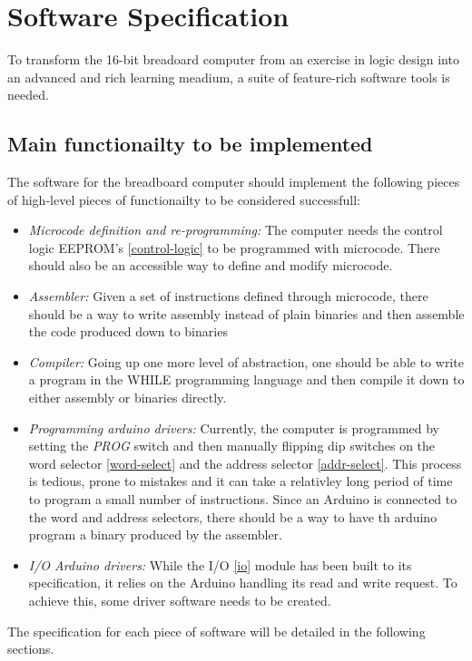 \chapter{Software Specification}
To transform the 16-bit breadoard computer from an exercise in logic design
into an advanced and rich learning meadium, a suite of feature-rich software
tools is needed.

\section{Main functionailty to be implemented}
The software for the breadboard computer should implement the following pieces
of high-level pieces of functionailty to be considered successfull:
\begin{itemize}
  \item \emph{Microcode definition and re-programming: } The computer needs the
  control logic EEPROM's \ref{control-logic} to be programmed with microcode. There
  should also be an accessible way to define and modify microcode.
  \item \emph{Assembler: } Given a set of instructions defined through microcode,
  there should be a way to write assembly instead of plain binaries and then assemble
  the code produced down to binaries
  \item \emph{Compiler: } Going up one more level of abstraction, one should be able
  to write a program in the WHILE programming language and then compile it down to
  either assembly or binaries directly.
  \item \emph{Programming arduino drivers: } Currently, the computer is programmed
  by setting the \emph{PROG} switch and then manually flipping dip switches on
  the word selector \ref{word-select} and the address selector \ref{addr-select}. This
  process is tedious, prone to mistakes and it can take a relativley long period of time
  to program a small number of instructions. Since an Arduino is connected to the word
  and address selectors, there should be a way to have th arduino program a binary produced
  by the assembler.
  \item \emph{I/O Arduino drivers: } While the I/O \ref{io} module has been built to its
  specification, it relies on the Arduino handling its read and write request. To achieve this,
  some driver software needs to be created.
\end{itemize}
The specification for each piece of software will be detailed in the following sections.

